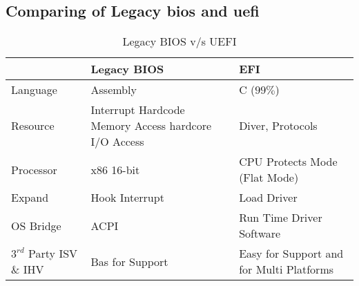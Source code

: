 \subsection{Comparing of Legacy \gls{bios} and \gls{uefi}}

\begin{table}
	\centering
	\renewcommand{\arraystretch}{2}
	\caption{Legacy BIOS v/s UEFI}\label{table:legacy-bios-vs-uefi}
	\begin{tabular}{l | p{5cm} | p{5cm}}
		& Legacy BIOS & EFI
		\\ \hline \hline
		Language & Assembly & C ($ 99\% $)
		\\ \hline
		Resource & Interrupt Hardcode Memory Access hardcore I/O Access & Diver, Protocols
		\\ \hline
		Processor & x86 16-bit & CPU Protects Mode (Flat Mode)
		\\ \hline
		Expand & Hook Interrupt & Load Driver
		\\ \hline
		OS Bridge & ACPI & Run Time Driver Software
		\\ \hline
		$ 3^{rd} $ Party ISV \& IHV & Bas for Support & Easy for Support and for Multi Platforms
		\\ \hline
	\end{tabular}
\end{table}





